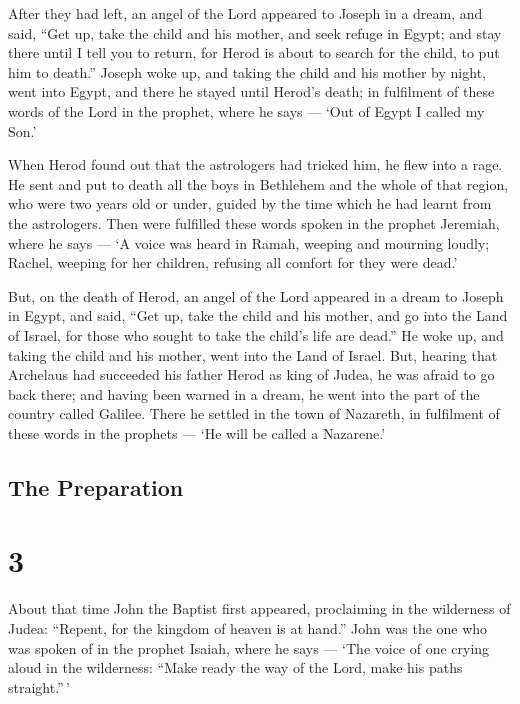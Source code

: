  After they had left, an angel of the Lord appeared to
Joseph in a dream, and said, ``Get up, take the child and his mother,
and seek refuge in Egypt; and stay there until I tell you to return, for
Herod is about to search for the child, to put him to death.''
 Joseph woke up, and taking the child and his mother by
night, went into Egypt,  and there he stayed until Herod's
death; in fulfilment of these words of the Lord in the prophet, where he
says --- `Out of Egypt I called my Son.'

 When Herod found out that the astrologers had tricked him,
he flew into a rage. He sent and put to death all the boys in Bethlehem
and the whole of that region, who were two years old or under, guided by
the time which he had learnt from the astrologers.  Then
were fulfilled these words spoken in the prophet Jeremiah, where he says
---  `A voice was heard in Ramah, weeping and mourning
loudly; Rachel, weeping for her children, refusing all comfort for they
were dead.'

 But, on the death of Herod, an angel of the Lord appeared
in a dream to Joseph in Egypt, and said,  ``Get up, take
the child and his mother, and go into the Land of Israel, for those who
sought to take the child's life are dead.''  He woke up,
and taking the child and his mother, went into the Land of Israel.
 But, hearing that Archelaus had succeeded his father Herod
as king of Judea, he was afraid to go back there; and having been warned
in a dream, he went into the part of the country called Galilee.
 There he settled in the town of Nazareth, in fulfilment of
these words in the prophets --- `He will be called a Nazarene.'

\hypertarget{the-preparation}{%
\subsection{The Preparation}\label{the-preparation}}

\hypertarget{section-2}{%
\section{3}\label{section-2}}

 About that time John the Baptist first appeared,
proclaiming in the wilderness of Judea:  ``Repent, for the
kingdom of heaven is at hand.''  John was the one who was
spoken of in the prophet Isaiah, where he says --- `The voice of one
crying aloud in the wilderness: ``Make ready the way of the Lord, make
his paths straight.''\,'

